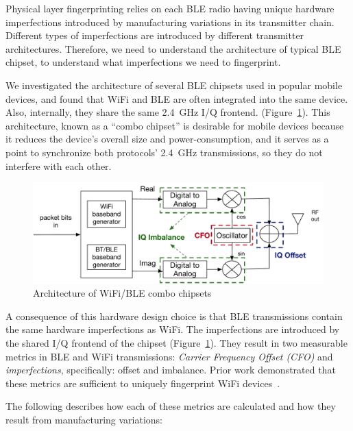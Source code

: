%
Physical layer fingerprinting relies on each BLE radio having unique hardware
imperfections introduced by manufacturing variations in its transmitter chain.
Different types of imperfections are introduced by different transmitter
architectures. Therefore, we need to understand the architecture of typical BLE
chipset, to understand what imperfections we need to fingerprint.

We investigated the architecture of several BLE chipsets used in popular mobile
devices, and found that WiFi and BLE are often integrated into the same device.
Also, internally, they share the same 2.4~GHz I/Q frontend.
(Figure~\ref{fig:iq_arch}). This architecture, known as a ``combo chipset'' is
desirable for mobile devices because it reduces the device's overall size and
power-consumption, and it serves as a point to synchronize both protocols'
2.4~GHz transmissions, so they do not interfere with each other.

\begin{figure}
    \centering
    \includegraphics[width = \linewidth]{plots/IQchain.pdf} 
    \caption{Architecture of WiFi/BLE combo chipsets}
    \label{fig:iq_arch}
\end{figure}

A consequence of this hardware design choice is that BLE transmissions contain the
same hardware imperfections as WiFi. The imperfections are introduced by the
shared I/Q frontend of the chipset (Figure~\ref{fig:iq_arch}). They result in
two measurable metrics in BLE and WiFi transmissions: \emph{Carrier Frequency
Offset (CFO)} and \emph{\iq imperfections}, specifically: \iq offset and \iq
imbalance.  Prior work demonstrated that these metrics are sufficient to
uniquely fingerprint WiFi devices~\cite{Brik_radiometric}.

The following describes how each of these metrics are calculated and how 
they result from manufacturing variations:

